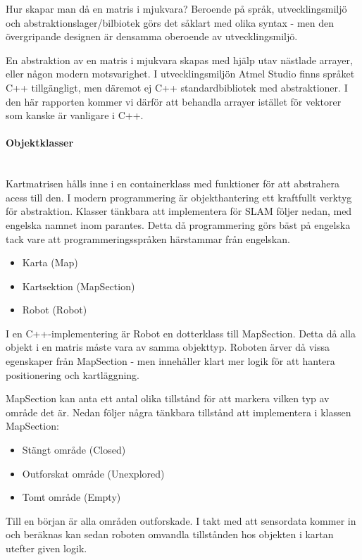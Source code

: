 \documentclass[a4paper,12pt,fleqn]{article}
\begin{document}
Hur skapar man då en matris i mjukvara? Beroende på språk, utvecklingsmiljö och abstraktionslager/bilbiotek görs det såklart med olika syntax - men den övergripande designen är densamma oberoende av utvecklingsmiljö. 

En abstraktion av en matris i mjukvara skapas med hjälp utav nästlade arrayer, eller någon modern motsvarighet. I utvecklingsmiljön Atmel Studio finns språket C++ tillgängligt, men däremot ej C++ standardbibliotek med abstraktioner. I den här rapporten kommer vi därför att behandla arrayer istället för vektorer som kanske är vanligare i C++. 

\paragraph{Objektklasser}
~\\
Kartmatrisen hålls inne i en containerklass med funktioner för att abstrahera acess till den. I modern programmering är objekthantering ett kraftfullt verktyg för abstraktion. Klasser tänkbara att implementera för SLAM följer nedan, med engelska namnet inom parantes. Detta då programmering görs bäst på engelska tack vare att programmeringsspråken härstammar från engelskan. 

\begin{itemize}
	\item Karta (Map)
	\item Kartsektion (MapSection)
	\item Robot (Robot)
\end{itemize}

I en C++-implementering är Robot en dotterklass till MapSection. Detta då alla objekt i en matris måste vara av samma objekttyp. Roboten ärver då vissa egenskaper från MapSection - men innehåller klart mer logik för att hantera positionering och kartläggning. 

MapSection kan anta ett antal olika tillstånd för att markera vilken typ av område det är. Nedan följer några tänkbara tillstånd att implementera i klassen MapSection: 

\begin{itemize}
	\item Stängt område (Closed)
	\item Outforskat område (Unexplored)
	\item Tomt område (Empty)
\end{itemize}

Till en början är alla områden outforskade. I takt med att sensordata kommer in och beräknas kan sedan roboten omvandla tillstånden hos objekten i kartan utefter given logik. 
\end{document}
